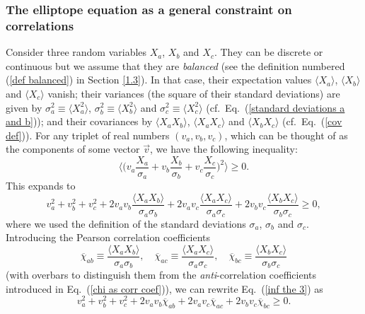 \subsubsection{The elliptope equation as a general constraint on correlations} \label{1.6.1}

Consider three random variables $X_a$, $X_b$ and $X_c$. They can be discrete or continuous but we assume that they are \emph{balanced} (see the definition numbered (\ref{def balanced}) in Section \ref{1.3}). In that case, their expectation values $\langle X_a \rangle$, $\langle X_b \rangle$ and $\langle X_c \rangle$ vanish; their variances (the square of their standard deviations) are given by $\sigma_a^2 \equiv \langle X_a^2 \rangle$, $\sigma_b^2 \equiv \langle X_b^2 \rangle$ and $\sigma_c^2 \equiv \langle X_c^2 \rangle$ (cf.\ Eq.\ (\ref{standard deviations a and b})); and their covariances by $\langle X_a X_b \rangle$, $\langle X_a X_c \rangle$ and $\langle X_b X_c \rangle$ (cf.\ Eq.\ (\ref{cov def})). For any triplet of real numbers $(v_a, v_b, v_c)$, which can be thought of as the components of some vector $\vec{v}$, we have the following inequality: 
\begin{equation}
\Big\langle \Big( v_a \frac{X_a}{\sigma_a} + v_b \frac{X_b}{\sigma_b} + v_c \frac{X_c}{\sigma_c} \Big)^{\!2} \Big\rangle \ge 0.
\label{inf the 1}
\end{equation}
This expands to
\begin{equation}
v_a^2 + v_b^2 + v_c^2 + 2 v_a v_b \frac{\langle X_a X_b \rangle}{\sigma_a \sigma_b} + 2 v_a v_c \frac{\langle X_a X_c \rangle}{\sigma_a \sigma_c} + 2 v_b v_c \frac{\langle X_b X_c \rangle}{\sigma_b \sigma_c} \ge 0,
\label{inf the 3}
\end{equation}
where we used the definition of the standard deviations $\sigma_a$, $\sigma_b$ and $\sigma_c$. Introducing the Pearson correlation coefficients
\begin{equation}
\overline{\chi}_{ab} \equiv \frac{\langle X_a X_b \rangle}{\sigma_a \sigma_b}, \quad
\overline{\chi}_{ac} \equiv \frac{\langle X_a X_c \rangle}{\sigma_a \sigma_c}, \quad
\overline{\chi}_{bc} \equiv \frac{\langle X_b X_c \rangle}{\sigma_b \sigma_c}
\label{corr coeff gen}
\end{equation}
(with overbars to distinguish them from the \emph{anti}-correlation coefficients introduced in Eq.\ (\ref{chi as corr coef})), we can rewrite Eq.\ (\ref{inf the 3}) as
\begin{equation}
v_a^2 + v_b^2 + v_c^2 + 2 v_a v_b \overline{\chi}_{ab} + 2 v_a v_c \overline{\chi}_{ac}  +  2 v_b v_c \overline{\chi}_{bc} \ge 0.
\label{inf the 4a}
\end{equation}
